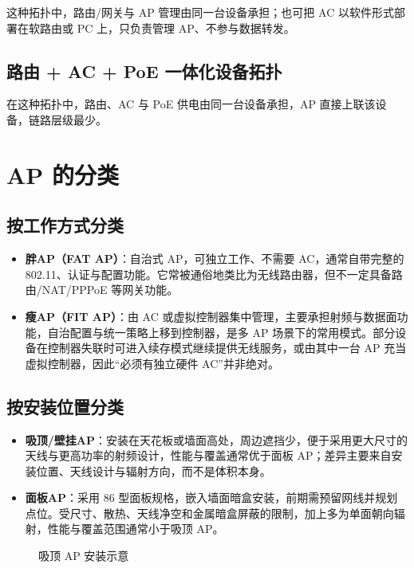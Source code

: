 \documentclass[UTF8]{ctexbook}
\begin{document}
这种拓扑中，路由/网关与 AP 管理由同一台设备承担；也可把 AC 以软件形式部署在软路由或 PC 上，只负责管理 AP、不参与数据转发。

\subsection{路由 + AC + PoE 一体化设备拓扑}

在这种拓扑中，路由、AC 与 PoE 供电由同一台设备承担，AP 直接上联该设备，链路层级最少。

\section{AP 的分类}

\subsection{按工作方式分类}

\begin{itemize}
  \item \textbf{胖AP（FAT AP）}：自治式 AP，可独立工作、不需要 AC，通常自带完整的 802.11、认证与配置功能。它常被通俗地类比为无线路由器，但不一定具备路由/NAT/PPPoE 等网关功能。
  \item \textbf{瘦AP（FIT AP）}：由 AC 或虚拟控制器集中管理，主要承担射频与数据面功能，自治配置与统一策略上移到控制器，是多 AP 场景下的常用模式。部分设备在控制器失联时可进入续存模式继续提供无线服务，或由其中一台 AP 充当虚拟控制器，因此\textquotedblleft 必须有独立硬件 AC\textquotedblright 并非绝对。
\end{itemize}

\subsection{按安装位置分类}

\begin{itemize}
  \item \textbf{吸顶/壁挂AP}：安装在天花板或墙面高处，周边遮挡少，便于采用更大尺寸的天线与更高功率的射频设计，性能与覆盖通常优于面板 AP；差异主要来自安装位置、天线设计与辐射方向，而不是体积本身。
  \item \textbf{面板AP}：采用 86 型面板规格，嵌入墙面暗盒安装，前期需预留网线并规划点位。受尺寸、散热、天线净空和金属暗盒屏蔽的限制，加上多为单面朝向辐射，性能与覆盖范围通常小于吸顶 AP。
\end{itemize}

\begin{figure}[htbp]
\centering
\caption{吸顶 AP 安装示意}
\label{fig:ceiling-ap}
\end{figure}
\end{document}
